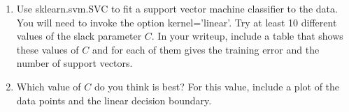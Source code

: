 \documentclass{article}
\begin{document}
\begin{enumerate}
\begin{enumerate}
        \item Use sklearn.svm.SVC to fit a support vector machine classifier to the data. You will need to invoke the option kernel='linear'. Try at least 10 different values of the slack parameter $C$. In your writeup, include a table that shows these values of $C$ and for each of them gives the training error and the number of support vectors.

        \item Which value of $C$ do you think is best? For this value, include a plot of the data points and the linear decision boundary.
    \end{enumerate}
\end{enumerate}
\end{document}
